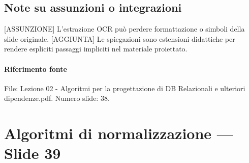 \documentclass[11pt]{article}
\begin{document}
\subsection*{Note su assunzioni o integrazioni}
[ASSUNZIONE] L'estrazione OCR può perdere formattazione o simboli della slide originale.
[AGGIUNTA] Le spiegazioni sono estensioni didattiche per rendere espliciti passaggi impliciti nel materiale proiettato.
\paragraph{Riferimento fonte} File: Lezione 02 - Algoritmi per la progettazione di DB Relazionali e ulteriori dipendenze.pdf. Numero slide: 38.
\section{Algoritmi di normalizzazione --- Slide 39}
\end{document}

